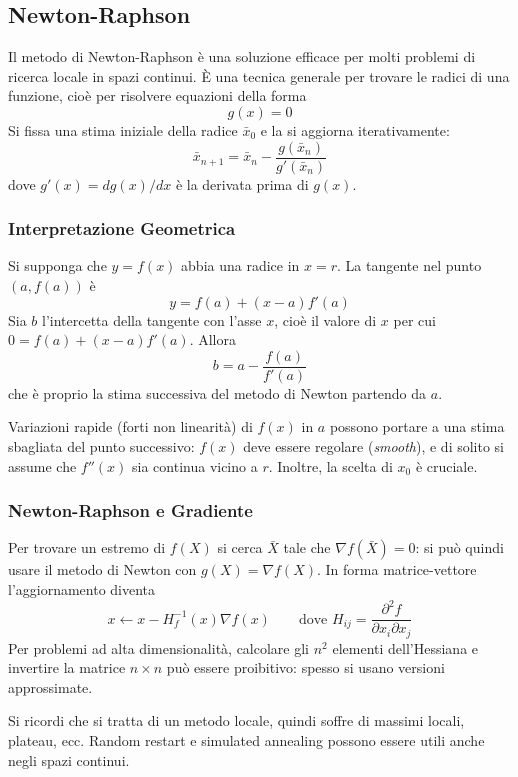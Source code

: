 \documentclass[a4paper, 11pt, oneside]{book}
\theoremstyle{definition}
\begin{document}
    \subsection{Newton-Raphson}
    Il metodo di Newton-Raphson \`e una soluzione efficace per molti problemi di ricerca
    locale in spazi continui. \`E una tecnica generale per trovare le radici di una
    funzione, cio\`e per risolvere equazioni della forma
    \[
        g(x) = 0
    \]
    Si fissa una stima iniziale della radice $\bar{x}_0$ e la si aggiorna iterativamente:
    \[
        \bar{x}_{n+1} = \bar{x}_n - \frac{g(\bar{x}_n)}{g'(\bar{x}_n)}
    \]
    dove $g'(x) = dg(x)/dx$ \`e la derivata prima di $g(x)$.

    \subsubsection*{Interpretazione Geometrica}
    Si supponga che $y = f(x)$ abbia una radice in $x = r$. La tangente nel punto
    $(a, f(a))$ \`e
    \[
        y = f(a) + (x - a) f'(a)
    \]
    Sia $b$ l'intercetta della tangente con l'asse $x$, cio\`e il valore di $x$ per cui
    $0 = f(a) + (x - a) f'(a)$. Allora
    \[
        b = a - \frac{f(a)}{f'(a)}
    \]
    che \`e proprio la stima successiva del metodo di Newton partendo da $a$.

    Variazioni rapide (forti non linearit\`a) di $f(x)$ in $a$ possono portare a una stima
    sbagliata del punto successivo: $f(x)$ deve essere regolare (\emph{smooth}), e di solito
    si assume che $f''(x)$ sia continua vicino a $r$. Inoltre, la scelta di $x_0$ \`e
    cruciale.

    \subsubsection*{Newton-Raphson e Gradiente}
    Per trovare un estremo di $f(X)$ si cerca $\bar{X}$ tale che $\nabla f(\bar{X}) = 0$: si
    pu\`o quindi usare il metodo di Newton con $g(X) = \nabla f(X)$. In forma
    matrice-vettore l'aggiornamento diventa
    \[
        x \leftarrow x - H_f^{-1}(x) \nabla f(x)
        \qquad \text{dove } H_{ij} = \frac{\partial^2 f}{\partial x_i \partial x_j}
    \]
    Per problemi ad alta dimensionalit\`a, calcolare gli $n^2$ elementi dell'Hessiana e
    invertire la matrice $n \times n$ pu\`o essere proibitivo: spesso si usano versioni
    approssimate.

    Si ricordi che si tratta di un metodo locale, quindi soffre di massimi locali, plateau,
    ecc. Random restart e simulated annealing possono essere utili anche negli spazi
    continui.
\end{document}
